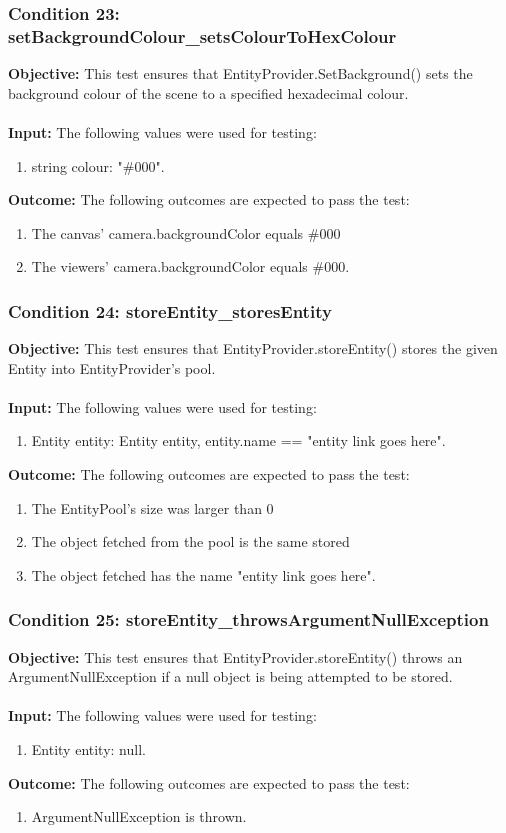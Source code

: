 \documentclass[a4paper,12pt]{article}
\begin{document}
		\subsubsection{Condition 23: setBackgroundColour\_setsColourToHexColour}
			\textbf{Objective:} This test ensures that EntityProvider.SetBackground() sets the background colour of the scene to a specified hexadecimal colour.\\\\
			\textbf{Input:} The following values were used for testing:
				\begin{enumerate}
					\item string colour: "\#000".
				\end{enumerate}
			\textbf{Outcome:} The following outcomes are expected to pass the test:
				\begin{enumerate}
					\item The canvas' camera.backgroundColor equals \#000
					\item The viewers' camera.backgroundColor equals \#000.
				\end{enumerate}
		\subsubsection{Condition 24: storeEntity\_storesEntity}
			\textbf{Objective:} This test ensures that EntityProvider.storeEntity() stores the given Entity into EntityProvider's pool.\\\\
			\textbf{Input:} The following values were used for testing:
				\begin{enumerate}
					\item Entity entity: Entity entity, entity.name == "entity link goes here".
				\end{enumerate}
			\textbf{Outcome:} The following outcomes are expected to pass the test:
				\begin{enumerate}
					\item The EntityPool's size was larger than 0
					\item The object fetched from the pool is the same stored
					\item The object fetched has the name "entity link goes here".
				\end{enumerate}
		\subsubsection{Condition 25: storeEntity\_throwsArgumentNullException}
			\textbf{Objective:} This test ensures that EntityProvider.storeEntity() throws an ArgumentNullException if a null object is being attempted to be stored.\\\\
			\textbf{Input:} The following values were used for testing:
				\begin{enumerate}
					\item Entity entity: null.
				\end{enumerate}
			\textbf{Outcome:} The following outcomes are expected to pass the test:
				\begin{enumerate}
					\item ArgumentNullException is thrown.
				\end{enumerate}
\end{document}

